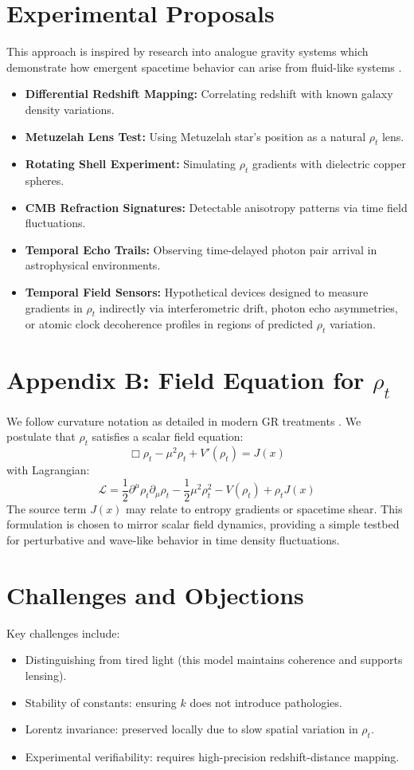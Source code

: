 \documentclass[12pt]{article}
\begin{document}
\section{Experimental Proposals}
This approach is inspired by research into analogue gravity systems which demonstrate how emergent spacetime behavior can arise from fluid-like systems \cite{barcelo2011}.
\begin{itemize}
  \item \textbf{Differential Redshift Mapping:} Correlating redshift with known galaxy density variations.
  \item \textbf{Metuzelah Lens Test:} Using Metuzelah star’s position as a natural $\rho_t$ lens.
  \item \textbf{Rotating Shell Experiment:} Simulating $\rho_t$ gradients with dielectric copper spheres.
  \item \textbf{CMB Refraction Signatures:} Detectable anisotropy patterns via time field fluctuations.
  \item \textbf{Temporal Echo Trails:} Observing time-delayed photon pair arrival in astrophysical environments.
  \item \textbf{Temporal Field Sensors:} Hypothetical devices designed to measure gradients in $\rho_t$ indirectly via interferometric drift, photon echo asymmetries, or atomic clock decoherence profiles in regions of predicted $ \rho_t $ variation.
\end{itemize}

\section{Appendix B: Field Equation for $\rho_t$}
We follow curvature notation as detailed in modern GR treatments \cite{carroll2004}.
We postulate that $\rho_t$ satisfies a scalar field equation:
\[ \Box \rho_t - \mu^2 \rho_t + V'(\rho_t) = J(x) \]
with Lagrangian:
\[ \mathcal{L} = \frac{1}{2} \partial^\mu \rho_t \partial_\mu \rho_t - \frac{1}{2} \mu^2 \rho_t^2 - V(\rho_t) + \rho_t J(x) \]
The source term $J(x)$ may relate to entropy gradients or spacetime shear. This formulation is chosen to mirror scalar field dynamics, providing a simple testbed for perturbative and wave-like behavior in time density fluctuations.

\section{Challenges and Objections}
Key challenges include:
\begin{itemize}
  \item Distinguishing from tired light (this model maintains coherence and supports lensing).
  \item Stability of constants: ensuring $k$ does not introduce pathologies.
  \item Lorentz invariance: preserved locally due to slow spatial variation in $\rho_t$.
  \item Experimental verifiability: requires high-precision redshift-distance mapping.
\end{itemize}
\end{document}
